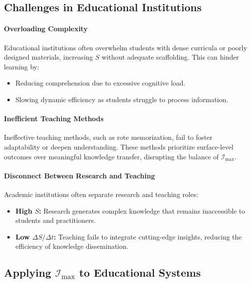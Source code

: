 \documentclass[12pt]{article}
\begin{document}
\subsection{Challenges in Educational Institutions}
\paragraph{Overloading Complexity}
Educational institutions often overwhelm students with dense curricula or poorly designed materials, increasing \( S \) without adequate scaffolding. This can hinder learning by:
\begin{itemize}
    \item Reducing comprehension due to excessive cognitive load.
    \item Slowing dynamic efficiency as students struggle to process information.
\end{itemize}

\paragraph{Inefficient Teaching Methods}
Ineffective teaching methods, such as rote memorization, fail to foster adaptability or deepen understanding. These methods prioritize surface-level outcomes over meaningful knowledge transfer, disrupting the balance of \( \mathcal{I}_{\text{max}} \).

\paragraph{Disconnect Between Research and Teaching}
Academic institutions often separate research and teaching roles:
\begin{itemize}
    \item \textbf{High \( S \):} Research generates complex knowledge that remains inaccessible to students and practitioners.
    \item \textbf{Low \( \Delta S / \Delta t \):} Teaching fails to integrate cutting-edge insights, reducing the efficiency of knowledge dissemination.
\end{itemize}

\subsection{Applying \(\mathcal{I}_{\text{max}}\) to Educational Systems}
\end{document}
